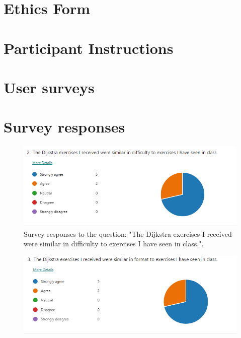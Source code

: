 \documentclass{l4proj}
\begin{document}
\begin{appendices}
\chapter{Ethics Form}
\label{chap:ethics_form}



\chapter{Participant Instructions}
\label{chap:participant_instructions}




\chapter{User surveys}
\label{chap:user_surveys}




\chapter{Survey responses}
\label{sec:survey_responses}
\begin{figure}[h]
    \centering
    \includegraphics[width=0.9\linewidth]{images/d_similar_difficulty.png}    

    \caption{Survey responses to the question: "The Dijkstra exercises I received were similar in difficulty to exercises I have seen in class.".}
    \label{fig:d_similar_difficulty} 
\end{figure}

\begin{figure}[h]
    \centering
    \includegraphics[width=0.9\linewidth]{images/d_similar_format.png}    


\end{figure}
\end{appendices}
\end{document}
